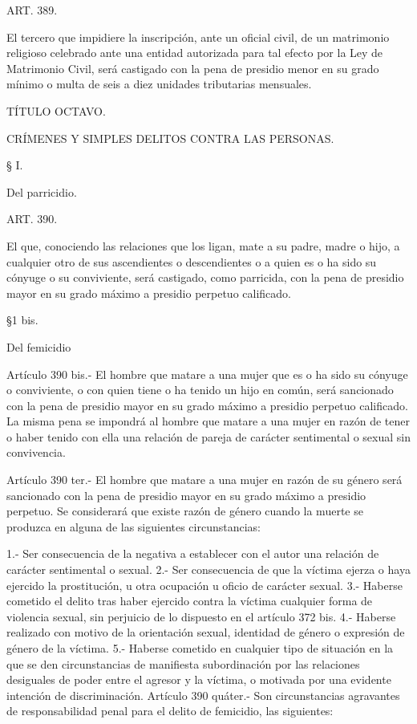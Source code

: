     ART. 389.

    El tercero que impidiere la inscripción, ante un oficial civil, de un matrimonio religioso celebrado ante una entidad autorizada para tal efecto por la Ley de Matrimonio Civil, será castigado con la pena de presidio menor en su grado mínimo o multa de seis a diez unidades tributarias mensuales.


    TÍTULO OCTAVO.
   
    CRÍMENES Y SIMPLES DELITOS CONTRA LAS PERSONAS.
   





    § I.

    Del parricidio.






    ART. 390.

    El que, conociendo las relaciones que los ligan, mate a su padre, madre o hijo, a cualquier otro de sus ascendientes o descendientes o a quien es o ha sido su cónyuge o su conviviente, será castigado, como parricida, con la pena de presidio mayor en su grado máximo a presidio perpetuo calificado.

    §1 bis.

    Del femicidio
     


    Artículo 390 bis.- El hombre que matare a una mujer que es o ha sido su cónyuge o conviviente, o con quien tiene o ha tenido un hijo en común, será sancionado con la pena de presidio mayor en su grado máximo a presidio perpetuo calificado.
    La misma pena se impondrá al hombre que matare a una mujer en razón de tener o haber tenido con ella una relación de pareja de carácter sentimental o sexual sin convivencia.
     
    Artículo 390 ter.- El hombre que matare a una mujer en razón de su género será sancionado con la pena de presidio mayor en su grado máximo a presidio perpetuo.
    Se considerará que existe razón de género cuando la muerte se produzca en alguna de las siguientes circunstancias:
     
    1.- Ser consecuencia de la negativa a establecer con el autor una relación de carácter sentimental o sexual.
    2.- Ser consecuencia de que la víctima ejerza o haya ejercido la prostitución, u otra ocupación u oficio de carácter sexual.
    3.- Haberse cometido el delito tras haber ejercido contra la víctima cualquier forma de violencia sexual, sin perjuicio de lo dispuesto en el artículo 372 bis.
    4.- Haberse realizado con motivo de la orientación sexual, identidad de género o expresión de género de la víctima.
    5.- Haberse cometido en cualquier tipo de situación en la que se den circunstancias de manifiesta subordinación por las relaciones desiguales de poder entre el agresor y la víctima, o motivada por una evidente intención de discriminación.
    Artículo 390 quáter.- Son circunstancias agravantes de responsabilidad penal para el delito de femicidio, las siguientes:
     
